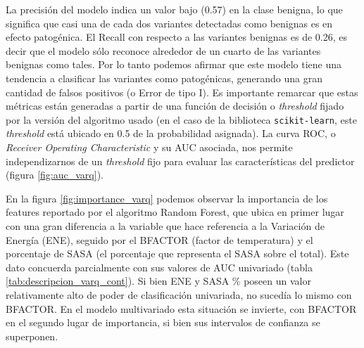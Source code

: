 La precisión del modelo indica un valor bajo (0.57) en la clase benigna, lo que significa que casi una de cada dos variantes detectadas como benignas es en efecto patogénica. El Recall con respecto a las variantes benignas es de 0.26, es decir que el modelo sólo reconoce alrededor de un cuarto de las variantes benignas como tales. Por lo tanto podemos afirmar que este modelo tiene una tendencia a clasificar las variantes como patogénicas, generando una gran cantidad de falsos positivos (o Error de tipo I). Es importante remarcar que estas métricas están generadas a partir de una función de decisión o \textit{threshold} fijado por la versión del algoritmo usado (en el caso de la biblioteca \texttt{scikit-learn}, este \textit{threshold} está ubicado en 0.5 de la probabilidad asignada).  La curva ROC, o \textit{Receiver Operating Characteristic} y su AUC asociada, nos permite independizarnos de un \textit{threshold} fijo para evaluar las características del predictor (figura \ref{fig:auc_varq}).

En la figura \ref{fig:importance_varq} podemos observar la importancia de los features reportado por el algoritmo Random Forest, que ubica en primer lugar con una gran diferencia a la variable que hace referencia a la Variación de Energía (ENE), seguido por el BFACTOR (factor de temperatura) y el porcentaje de SASA (el porcentaje que representa el SASA sobre el total). Este dato concuerda parcialmente con sus valores de AUC univariado (tabla \ref{tab:descripcion_varq_cont}). Si bien ENE y SASA \% poseen un valor relativamente alto de poder de clasificación univariada, no sucedía lo mismo con BFACTOR. En el modelo multivariado esta situación se invierte, con BFACTOR en el segundo lugar de importancia, si bien sus intervalos de confianza se superponen.

\newpage

